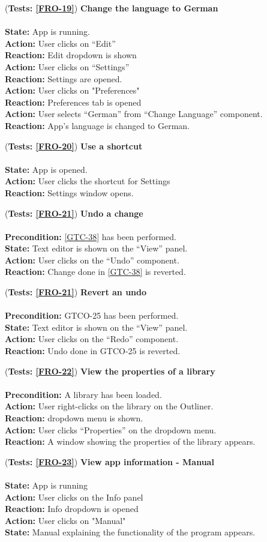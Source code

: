 \documentclass[10pt,a4paper]{report}
\newcommand{\precondition}[1]{
    \textbf{Precondition: } #1 \leavevmode \\
}
\newcommand{\action}[1]{
    \textbf{Action: } #1 \leavevmode \\
}
\newcommand{\state}[1]{
    \textbf{State: } #1 \leavevmode \\
}
\newcommand{\reaction}[1]{
    \textbf{Reaction: } #1 \leavevmode \\
}
\newcommand{\GTCODescription}[2]{
    (\textbf{Tests: #1}) \textbf{#2} \leavevmode \\
}
\begin{document}
\begin{GTCO}
    \item \GTCODescription{\ref{FRO-19}}
    {Change the language to German} \leavevmode \\ 
        \state{App is running.}
        \action{User clicks on “Edit”}
        \reaction{Edit dropdown is shown}
        \action{User clicks on “Settings”}
        \reaction{Settings are opened.}
        \action{User clicks on "Preferences"}
        \reaction{Preferences tab is opened}
        \action{User selects “German” from “Change Language” component.}
        \reaction{App’s language is changed to German.}\label{GTCO-22}
    
    
    \item \GTCODescription{\ref{FRO-20}}
    {Use a shortcut} \leavevmode \\ 
        \state{App is opened.} 
        \action{User clicks the shortcut for Settings}
        \reaction{Settings window opens.}\label{GTCO-23}
        
    \item \GTCODescription{\ref{FRO-21}}
    {Undo a change} \leavevmode \\ 
        \precondition{\ref{GTC-38} has been performed.}
        \state{Text editor is shown on the “View” panel.}
        \action{User clicks on the “Undo” component.}
        \reaction{Change done in \ref{GTC-38} is reverted.}\label{GTCO-24}
    
    \item \GTCODescription{\ref{FRO-21}}
    {Revert an undo} \leavevmode \\ 
        \precondition{GTCO-25 has been performed.}
        \state{Text editor is shown on the “View” panel.}
        \action{User clicks on the “Redo” component.}
        \reaction{Undo done in GTCO-25 is reverted.}\label{GTCO-25}
    
     \item \GTCODescription{\ref{FRO-22}}
     {View the properties of a library} \leavevmode \\ 
         \precondition{A library has been loaded.}
         \action{User right-clicks on the library on the Outliner.}
         \reaction{dropdown menu is shown.}
         \action{User clicks “Properties” on the dropdown menu.}
         \reaction{A window showing the properties of the library appears.}\label{GTCO-26}
     
     \item \GTCODescription{\ref{FRO-23}}
     {View app information - Manual} \leavevmode \\ 
         \state{App is running}
         \action{User clicks on the Info panel}
         \reaction{Info dropdown is opened}
         \action{User clicks on "Manual"}
         \state{Manual explaining the functionality of the program appears.}\label{GTCO-27}
  

\end{GTCO}
\end{document}
